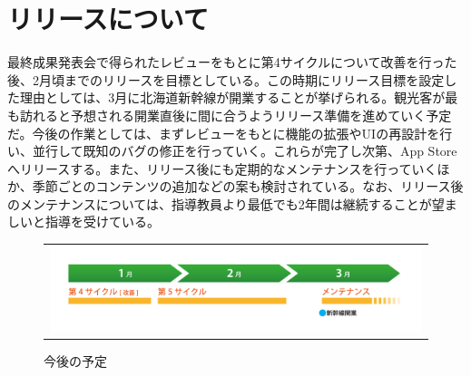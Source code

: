 \section{リリースについて}
最終成果発表会で得られたレビューをもとに第4サイクルについて改善を行った後、2月頃までのリリースを目標としている。この時期にリリース目標を設定した理由としては、3月に北海道新幹線が開業することが挙げられる。観光客が最も訪れると予想される開業直後に間に合うようリリース準備を進めていく予定だ。今後の作業としては、まずレビューをもとに機能の拡張やUIの再設計を行い、並行して既知のバグの修正を行っていく。これらが完了し次第、App Storeへリリースする。また、リリース後にも定期的なメンテナンスを行っていくほか、季節ごとのコンテンツの追加などの案も検討されている。なお、リリース後のメンテナンスについては、指導教員より最低でも2年間は継続することが望ましいと指導を受けている。
\begin{figure}[htbp]
  \begin{flushleft}
    \begin{tabular}{c}

      \begin{minipage}{0.7\hsize}
        \begin{center}
\includegraphics[width=15cm, bb=0 0 1478 338]{release-1.png}
       
        \end{center}
      \end{minipage}

    \end{tabular}
    \caption{今後の予定}
    \label{fig:lena}
  \end{flushleft}
\end{figure}
